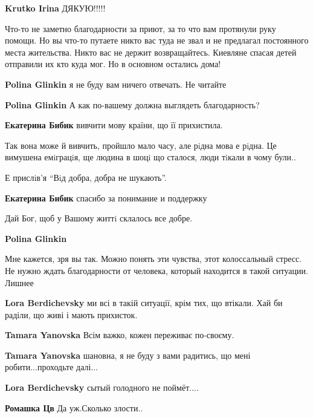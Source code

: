 \begin{itemize}
\begin{itemize}
\textbf{Krutko Irina} ДЯКУЮ!!!!!
\end{itemize} %


Что-то не заметно благодарности за приют, за то что вам протянули руку помощи.
Но вы что-то путаете никто вас туда не звал и не предлагал постоянного места
жительства. Никто вас не держит возвращайтесь. Киевляне спасая детей отправили
их кто куда мог. Но в основном остались дома!

\begin{itemize} %
\textbf{Polina Glinkin} я не буду вам ничего отвечать. Не читайте

\textbf{Polina Glinkin} А как по-вашему должна выглядеть благодарность?

\textbf{Екатерина Бибик} вивчити мову країни, що її прихистила.


Так вона може й вивчить, пройшло мало часу, але рiдна мова е рiдна. Це вимушена
емiграцiя, ще людина в шоцi що сталося, люди тiкали в чому були..

Е прислiв'я \enquote{Вiд добра, добра не шукають}.

\textbf{Екатерина Бибик} спасибо за понимание и поддержку

Дай Бог, щоб у Вашому життi склалось все добре.

\textbf{Polina Glinkin} 

Мне кажется, зря вы так. Можно понять эти чувства, этот колоссальный стресс. Не
нужно ждать благодарности от человека, который находится в такой ситуации. Лишнее

\begin{itemize} %
\textbf{Lora Berdichevsky} ми всі в такій ситуації, крім тих, що втікали. Хай би раділи, що живі і мають прихисток.

\textbf{Tamara Yanovska} Всім важко, кожен переживає по-своєму.

\textbf{Tamara Yanovska} шановна, я не буду з вами радитись, що мені робити...проходьте далі...

\textbf{Lora Berdichevsky} сытый голодного не поймёт....

\textbf{Ромашка Цв} Да уж.Сколько злости..


\end{itemize}
\end{itemize}
\end{itemize}
